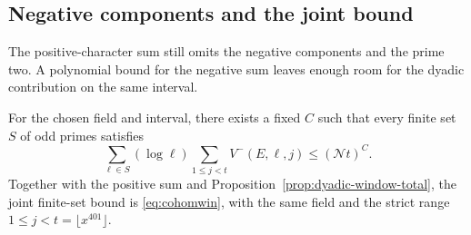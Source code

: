 \subsection{Negative components and the joint bound}
\label{subsec:odd-prime-negative}

The positive-character sum still omits the negative components and the prime two. A polynomial bound for the negative sum leaves enough room for the dyadic contribution on the same interval.

\begin{proposition}\label{prop:cohomology-joint-window}
For the chosen field and interval, there exists a fixed \(C\) such that every finite set \(S\) of odd primes satisfies 
\[
 \sum_{\ell\in S}(\log\ell)\sum_{1\le j<t}V^-(E,\ell,j)\le(\mathcal N t)^C.
\]
 Together with the positive sum and
Proposition~\ref{prop:dyadic-window-total}, the joint finite-set
bound is \eqref{eq:cohomwin}, with the same field and the strict
range \(1\le j<t=\lfloor x^{401}\rfloor\).
\end{proposition}

